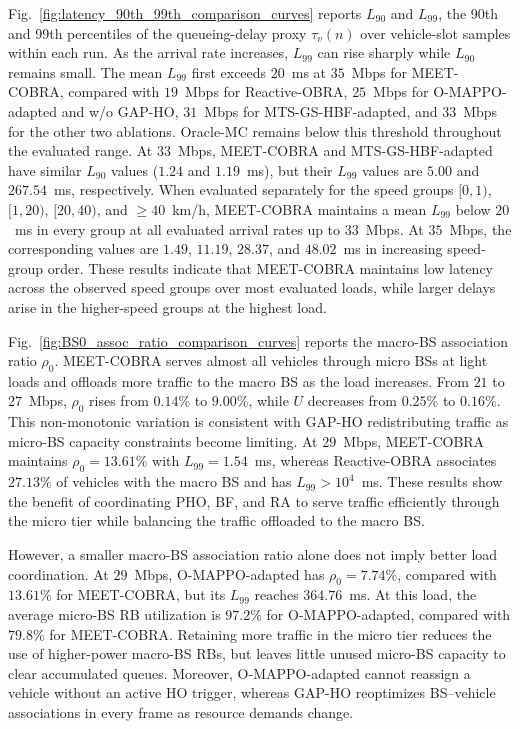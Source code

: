 \documentclass[10pt,journal,letterpaper]{IEEEtran}
\newcommand{\rev}[1]{\textcolor{revisioncolor}{{}#1}}
\theoremstyle{remark}
\begin{document}
\rev{Fig.~\ref{fig:latency_90th_99th_comparison_curves} reports $L_{90}$ and $L_{99}$, the 90th and 99th percentiles of the queueing-delay proxy $\tau_v(n)$ over vehicle-slot samples within each run. As the arrival rate increases, $L_{99}$ can rise sharply while $L_{90}$ remains small. The mean $L_{99}$ first exceeds $20$~ms at $35$~Mbps for MEET-COBRA, compared with $19$~Mbps for Reactive-OBRA, $25$~Mbps for O-MAPPO-adapted and w/o GAP-HO, $31$~Mbps for MTS-GS-HBF-adapted, and $33$~Mbps for the other two ablations. Oracle-MC remains below this threshold throughout the evaluated range. At $33$~Mbps, MEET-COBRA and MTS-GS-HBF-adapted have similar $L_{90}$ values ($1.24$ and $1.19$~ms), but their $L_{99}$ values are $5.00$ and $267.54$~ms, respectively.} \rev{When evaluated separately for the speed groups $[0,1)$, $[1,20)$, $[20,40)$, and $\geq40$~km/h, MEET-COBRA maintains a mean $L_{99}$ below $20$~ms in every group at all evaluated arrival rates up to $33$~Mbps. At $35$~Mbps, the corresponding values are $1.49$, $11.19$, $28.37$, and $48.02$~ms in increasing speed-group order. These results indicate that MEET-COBRA maintains low latency across the observed speed groups over most evaluated loads, while larger delays arise in the higher-speed groups at the highest load.}

\rev{Fig.~\ref{fig:BS0_assoc_ratio_comparison_curves} reports the macro-BS association ratio $\rho_0$. MEET-COBRA serves almost all vehicles through micro BSs at light loads and offloads more traffic to the macro BS as the load increases. From $21$ to $27$~Mbps, $\rho_0$ rises from $0.14\%$ to $9.00\%$, while $U$ decreases from $0.25\%$ to $0.16\%$. This non-monotonic variation is consistent with GAP-HO redistributing traffic as micro-BS capacity constraints become limiting. At $29$~Mbps, MEET-COBRA maintains $\rho_0=13.61\%$ with $L_{99}=1.54$~ms, whereas Reactive-OBRA associates $27.13\%$ of vehicles with the macro BS and has $L_{99}>10^4$~ms. These results show the benefit of coordinating PHO, BF, and RA to serve traffic efficiently through the micro tier while balancing the traffic offloaded to the macro BS.}

\rev{However, a smaller macro-BS association ratio alone does not imply better load coordination. At $29$~Mbps, O-MAPPO-adapted has $\rho_0=7.74\%$, compared with $13.61\%$ for MEET-COBRA, but its $L_{99}$ reaches $364.76$~ms. At this load, the average micro-BS RB utilization is $97.2\%$ for O-MAPPO-adapted, compared with $79.8\%$ for MEET-COBRA. Retaining more traffic in the micro tier reduces the use of higher-power macro-BS RBs, but leaves little unused micro-BS capacity to clear accumulated queues. Moreover, O-MAPPO-adapted cannot reassign a vehicle without an active HO trigger, whereas GAP-HO reoptimizes BS--vehicle associations in every frame as resource demands change.}
\end{document}
